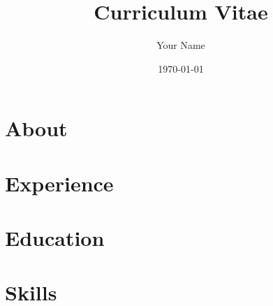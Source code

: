 \documentclass[a4paper,10pt]{article}
\begin{document}
    \title{Curriculum Vitae}
    \author{Your Name}
    \date{\today}
    \maketitle

    \section*{About}
    

    \section*{Experience}
    \begin{itemize}
    
    \end{itemize}

    \section*{Education}
    \begin{itemize}
    
    \end{itemize}

    \section*{Skills}
    \begin{itemize}
    
    \end{itemize}
    
\end{document}
